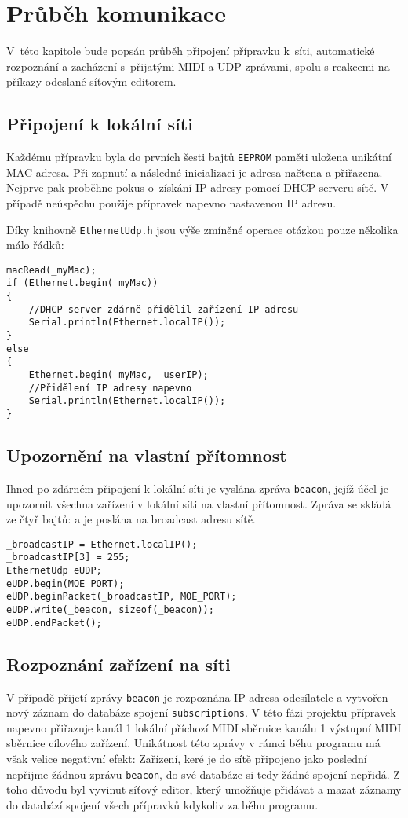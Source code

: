 \chapter{Průběh komunikace}
V~této kapitole bude popsán průběh připojení přípravku k~síti, automatické rozpoznání a zacházení s~přijatými \acs{MIDI} a \acs{UDP} zprávami, spolu s reakcemi na příkazy odeslané síťovým editorem.

\section{Připojení k lokální síti}
Každému přípravku byla do prvních šesti bajtů \texttt{EEPROM} paměti uložena unikátní MAC adresa. Při zapnutí a následné inicializaci je adresa načtena a přiřazena. Nejprve pak proběhne pokus o~získání IP adresy pomocí DHCP serveru sítě. V případě neúspěchu použije přípravek napevno nastavenou IP adresu. 

Díky knihovně \texttt{EthernetUdp.h} jsou výše zmíněné operace otázkou pouze několika málo řádků:

\begin{lstlisting}
macRead(_myMac);
if (Ethernet.begin(_myMac))
{
    //DHCP server zdárně přidělil zařízení IP adresu
    Serial.println(Ethernet.localIP());
}
else
{
    Ethernet.begin(_myMac, _userIP);
    //Přidělení IP adresy napevno
    Serial.println(Ethernet.localIP());
}
\end{lstlisting}






\section{Upozornění na vlastní přítomnost}
Ihned po zdárném připojení k lokální síti je vyslána zpráva  \texttt{beacon}, jejíž účel je upozornit všechna zařízení v lokální síti na vlastní přítomnost. Zpráva se skládá ze čtyř bajtů:
a je poslána na broadcast adresu sítě.

\begin{lstlisting}
_broadcastIP = Ethernet.localIP();
_broadcastIP[3] = 255;
EthernetUdp eUDP;
eUDP.begin(MOE_PORT);
eUDP.beginPacket(_broadcastIP, MOE_PORT);
eUDP.write(_beacon, sizeof(_beacon));
eUDP.endPacket();
\end{lstlisting}

\section{Rozpoznání zařízení na síti}
V případě přijetí zprávy \texttt{beacon} je rozpoznána IP adresa odesílatele a vytvořen nový záznam do databáze spojení \texttt{sub\-scrip\-tions}. V této fázi projektu přípravek napevno přiřazuje kanál 1  lokální příchozí \acs{MIDI} sběrnice kanálu 1 výstupní \acs{MIDI} sběrnice cílového zařízení. Unikátnost této zprávy v rámci běhu programu má však velice negativní efekt: Zařízení, keré je do sítě připojeno jako poslední nepřijme žádnou zprávu \texttt{beacon}, do své databáze si tedy žádné spojení nepřidá. Z toho důvodu byl vyvinut síťový editor, který umožňuje přidávat a mazat záznamy do databází spojení všech přípravků kdykoliv za běhu programu. 


